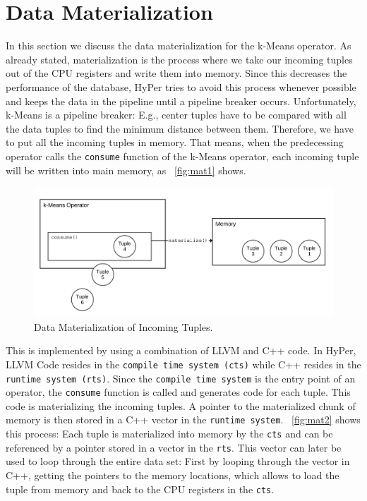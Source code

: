 \section{Data Materialization}

In this section we discuss the data materialization for the k-Means operator. As already stated, materialization is the process where we take our incoming tuples out of the CPU registers and write them into memory. Since this decreases the performance of the database, HyPer tries to avoid this process whenever possible and keeps the data in the pipeline until a pipeline breaker occurs. Unfortunately, k-Means is a pipeline breaker: E.g., center tuples have to be compared with all the data tuples to find the minimum distance between them. Therefore, we have to put all the incoming tuples in memory. That means, when the predecessing operator calls the \texttt{consume} function of the k-Means operator, each incoming tuple will be written into main memory, as ~\autoref{fig:mat1} shows. 

\begin{figure}[htsb]
  \centering
  \includegraphics[scale=0.05]{figures/mat1_font2}
  \caption[Data Materialization of Incoming Tuples]{Data Materialization of Incoming Tuples.}
  \label{fig:mat1}
\end{figure}

This is implemented by using a combination of LLVM and C++ code. In HyPer, LLVM Code resides in the \texttt{compile time system (cts)} while C++ resides in the \texttt{runtime system (rts)}. Since the \texttt{compile time system} is the entry point of an operator, the \texttt{consume} function is called and generates code for each tuple. This code is materializing the incoming tuples. A pointer to the materialized chunk of memory is then stored in a C++ vector in the \texttt{runtime system}. ~\autoref{fig:mat2} shows this process: Each tuple is materialized into memory by the \texttt{cts} and can be referenced by a pointer stored in a vector in the \texttt{rts}. This vector can later be used to loop through the entire data set: First by looping through the vector in C++, getting the pointers to the memory locations, which allows to load the tuple from memory and back to the CPU registers in the \texttt{cts}. 



